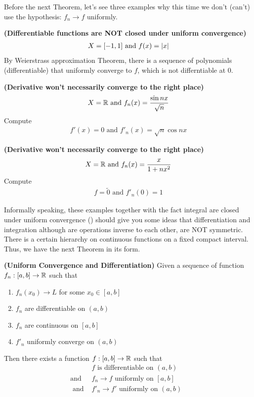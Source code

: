 \documentclass{report}
\begin{document}
\begin{mdframed}
Before the next Theorem, let's see three examples why this time we don't (can't) use the hypothesis: $f_n \to f$ uniformly. 
\begin{Example}{\textbf{(Differentiable functions are NOT closed under uniform convergence)}}{}
\begin{align*}
X=[-1,1]\text{ and }f(x)=\left|x\right|
\end{align*}
By Weierstrass approximation Theorem, there is a sequence of polynomials (differentiable) that uniformly converge to $f$, which is not differntiable at  $0$. 
\end{Example}
\begin{Example}{\textbf{(Derivative won't necessarily converge to the right place)}}{}
\begin{align*}
X=\mathbb{R} \text{ and }f_n(x)=\frac{\sin nx}{\sqrt{n} }
\end{align*}
Compute 
\begin{align*}
f'(x)=0 \text{ and }f'_n(x)=\sqrt{n} \cos nx
\end{align*}
\end{Example}
\begin{Example}{\textbf{(Derivative won't necessarily converge to the right place)}}{}
\begin{align*}
X=\mathbb{R} \text{ and }f_n(x)=\frac{x}{1+nx^2}
\end{align*}
Compute 
\begin{align*}
f=\tilde{0} \text{ and }f'_n(0)=1
\end{align*}
\end{Example}
Informally speaking, these examples together with the fact integral are closed under uniform convergence () should give you some ideas that differentiation and integration although are operations inverse to each other, are NOT symmetric. There is a certain hierarchy on continuous functions on a fixed compact interval. Thus, we have the next Theorem in its form. 
\end{mdframed}
\begin{theorem}
\label{UCaD}
\textbf{(Uniform Convergence and Differentiation)} Given a sequence of function $f_n:[a,b]\rightarrow \mathbb{R}$ such that 
\begin{enumerate}[label=(\alph*)]
  \item $f_n(x_0)\to L$ for some $x_0 \in [a,b]$
  \item $f_n$ are differentiable on $(a,b)$   
  \item $f_n$ are continuous on  $[a,b]$
  \item $f'_n$ uniformly converge on  $(a,b)$
\end{enumerate}
Then there exists a function $f:[a,b]\rightarrow \mathbb{R}$ such that 
\begin{align*}
&f\text{ is differentiable on $(a,b)$ }\\
  \text{and }&f_n \to f\text{ uniformly on $[a,b]$}\\
  \text{ and }&f'_n \to f'\text{ uniformly on $(a,b)$ } 
\end{align*}
\end{theorem}
\end{document}

